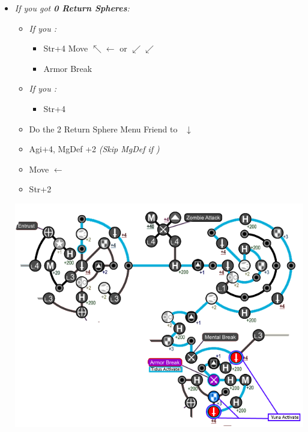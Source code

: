 \begin{spheregrid}
\begin{multicols}{2}
\begin{itemize}
\begin{itemize}
        \item \textit{If you got \textbf{0 Return Spheres}:}
              \begin{itemize}
              \item \textit{If you \wonblitz:}
              \begin{itemize}
                \tidusf Move to Str+4 by Mental Break $\rightarrow x3, \downarrow, \rightarrow x3$
                \yunaf Friend Sphere to \tidus
                \item Str+4
                \tidusf Move $\nwarrow\leftarrow$ or $\swarrow\swarrow$
                \item Armor Break
                \end{itemize}
		\item \textit{If you \lostblitz:}
                \begin{itemize}
                \tidusf Move to Armor Break $\rightarrow x3, \downarrow x6$
                \tidusf Armor Break
                \tidusf Move to HP $\searrow\searrow$
                      \yunaf Friend Sphere to \tidus
                \item Str+4
               \end{itemize}
                \item Do the 2 Return Sphere Menu
                \yunaf Friend to \rikku\ $\downarrow$
                \item Agi+4, MgDef +2 \textit{(Skip MgDef if \blitzloss)}
                \item Move $\leftarrow$
                \item Str+2
              \end{itemize}
              \includegraphics[width=.9\columnwidth]{graphics/0_returns}

\end{itemize}
\end{itemize}
\end{multicols}
\end{spheregrid}
